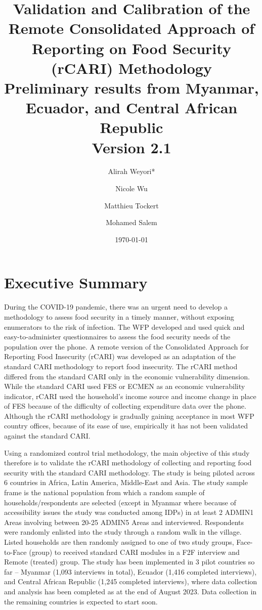 \documentclass[11pt,harvard]{article}
\author{Alirah Weyori* \and Nicole Wu \and Matthieu Tockert \and Mohamed Salem}
\date{\today}
\title{Validation and Calibration of the Remote Consolidated Approach of Reporting on Food Security (rCARI) Methodology 
	\\ {\normalsize Preliminary results from Myanmar, Ecuador, and Central African Republic} 
	\\{\normalsize{Version 2.1}} }
\begin{document}
	\maketitle \vspace{-1cm}
	\onehalfspacing
	\pagebreak
	\setlength{\parskip}{8pt} %
	
	\tableofcontents
	\pagebreak
	

\section{Executive Summary}

During the COVID-19 pandemic, there was an urgent need to develop a methodology to assess food security in a timely manner, without exposing enumerators to the risk of infection. The WFP developed and used quick and easy-to-administer questionnaires to assess the food security needs of the population over the phone. A remote version of the Consolidated Approach for Reporting Food Insecurity (rCARI) was developed as an adaptation of the standard CARI methodology to report food insecurity. The rCARI method differed from the standard CARI only in the economic vulnerability dimension. While the standard CARI used FES or ECMEN as an economic vulnerability indicator, rCARI used the household’s income source and income change in place of FES because of the difficulty of collecting expenditure data over the phone. Although the rCARI methodology is gradually gaining acceptance in most WFP country offices, because of its ease of use, empirically it has not been validated against the standard CARI. 

Using a randomized control trial methodology, the main objective of this study therefore is to validate the rCARI methodology of collecting and reporting food security with the standard CARI methodology. The study is being piloted across 6 countries in Africa, Latin America, Middle-East and Asia. The study sample frame is the national population from which a random sample of households/respondents are selected (except in Myanmar where because of accessibility issues the study was conducted among IDPs) in at least 2 ADMIN1 Areas involving between 20-25 ADMIN5 Areas and interviewed. Respondents were randomly enlisted into the study through a random walk in the village. Listed households are then randomly assigned to one of two study groups, Face-to-Face (group) to received standard CARI modules in a F2F interview and Remote (treated) group. The study has been implemented in 3 pilot countries so far – Myanmar (1,093 interviews in total), Ecuador (1,416 completed interviews), and Central African Republic (1,245 completed interviews), where data collection and analysis has been completed as at the end of August 2023. Data collection in the remaining countries is expected to start soon. 
\end{document}
